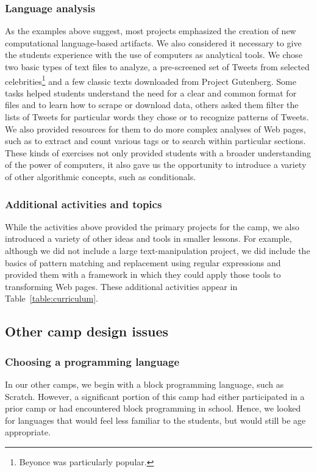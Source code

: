 \subsubsection{Language analysis}

As the examples above suggest, most projects emphasized the creation
of new computational language-based artifacts.  We also considered
it necessary to give the students experience with the use of computers
as analytical tools.  We chose two basic types of text files to
analyze, a pre-screened set of Tweets from selected
celebrities\footnote{Beyonce was particularly popular.} and a few
classic texts downloaded from Project Gutenberg.  Some tasks helped
students understand the need for a clear and common format for
files and to learn how to scrape or download data, others asked
them filter the lists of Tweets for particular words they chose or
to recognize patterns of Tweets.  We also provided resources for
them to do more complex analyses of Web pages, such as to extract
and count various tags or to search within particular sections.
These kinds of exercises not only provided students with a broader 
understanding of the power of computers, it also gave us the opportunity
to introduce a variety of other algorithmic concepts, such as conditionals.

\subsubsection{Additional activities and topics}

While the activities above provided the primary projects for the
camp, we also introduced a variety of other ideas and tools in
smaller lessons.  For example, although we did not include a large
text-manipulation project, we did include the basics of pattern
matching and replacement using regular expressions and provided
them with a framework in which they could apply those tools to
transforming Web pages.  These additional
activities appear in Table~\ref{table:curriculum}.

\subsection{Other camp design issues}

\subsubsection{Choosing a programming language}

In our other camps, we begin with a block programming language,
such as Scratch.  However, a significant portion of this camp had
either participated in a prior camp or had encountered block
programming in school.  Hence, we looked for languages that would
feel less familiar to the students, but would still be age appropriate.

